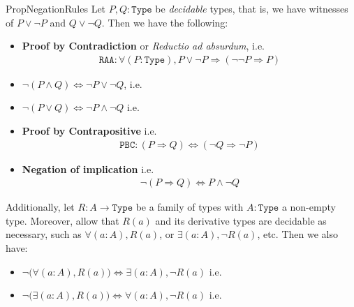\documentclass[11pt]{article}
\begin{document}
\begin{label theorem}{PropNegationRules}
Let $P,Q \colon \mathtt{Type}$ be \emph{decidable} types, that is, we have witnesses of $P \vee \neg P$ and $Q \vee \neg Q$. Then we have the following: \begin{itemize}

\item \textbf{Proof by Contradiction} or \emph{Reductio ad absurdum}, i.e. 
\begin{gather*}
\mathtt{RAA}\colon \forall (P : \mathtt{Type} ), P \vee \neg P \Rightarrow ( \neg \neg P \Rightarrow P)
\end{gather*}

\item $\neg(P \wedge Q) \Leftrightarrow \neg P \vee \neg Q$, i.e. 

\item $\neg (P \vee Q) \Leftrightarrow \neg P \wedge \neg Q$ i.e. 

\item \textbf{Proof by Contrapositive} i.e. 
\begin{gather*}
\mathtt{PBC} \colon (P \Rightarrow Q) \Leftrightarrow (\neg Q \Rightarrow \neg P)
\end{gather*}

\item \textbf{Negation of implication} i.e. 
\begin{gather*}
\neg (P \Rightarrow Q) \Leftrightarrow P \wedge \neg Q
\end{gather*}
\end{itemize}
Additionally, let $R \colon A \to \mathtt{Type}$ be a family of types with $A \colon \mathtt{Type}$ a non-empty type. Moreover, allow that $R(a)$ and its derivative types are decidable as necessary, such as $\forall (a:A), R(a)$, or $\exists (a : A), \neg R(a)$, etc. Then we also have:
\begin{itemize}
\item $\neg \big(\forall (a : A), R(a) \big) \Leftrightarrow \exists (a : A), \neg R(a)$ i.e. 
\item $\neg \big(\exists (a : A), R(a)\big) \Leftrightarrow \forall (a : A), \neg R(a)$ i.e. 
\end{itemize}
\end{label theorem}
\end{document}
